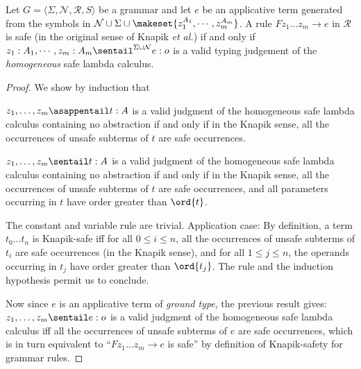 \begin{proposition}
\label{prop:safegram_safelmd}
 Let $G = \langle \Sigma, \mathcal{N}, \mathcal{R},
  S \rangle$ be a grammar and let $e$ be an applicative term generated
  from the symbols in $\mathcal{N} \cup \Sigma \cup \makeset{z_1^{A_1},
    \cdots, z_m^{A_m}}$.  A rule $F z_1 \ldots z_m \rightarrow e$ in
  $\mathcal{R}$ is safe (in the original sense of Knapik \emph{et al.}) if and only if $ z_1 : A_1, \cdots, z_m : A_m
  \sentail^{\Sigma \cup \mathcal{N}} e : o$ is a valid typing judgement
  of the \emph{homogeneous} safe lambda calculus.
\end{proposition}
\begin{proof}
We show by induction that \begin{asparaenum}
\item  $z_1,\ldots, z_m \asappentail t:A$ is a valid judgment of the homogeneous safe lambda calculus containing no abstraction if and only if in the Knapik sense, all the occurrences of unsafe subterms of $t$ are safe occurrences.
\item $z_1,\ldots, z_m \sentail t:A$ is a valid judgment of the homogeneous safe lambda calculus containing no abstraction if and only if in the Knapik sense, all the occurrences of unsafe subterms of $t$ are safe occurrences, and all parameters occurring in $t$ have order greater than $\ord{t}$. \end{asparaenum}
The constant and variable rule are trivial. Application case: By definition, a term $t_0 \ldots t_n$ is Knapik-safe iff for all $0\leq i \leq n$, all the occurrences of unsafe subterms of $t_i$ are safe occurrences (in the Knapik sense), and for all $1\leq j \leq n$, the operands occurring in $t_j$ have order greater than $\ord{t_j}$. The  rule and the induction hypothesis permit us to conclude.

Now since $e$ is an applicative term of \emph{ground type}, the previous result gives:
$z_1,\ldots, z_m \sentail e:o$ is a valid judgment of the homogeneous safe lambda calculus iff
all the occurrences of unsafe subterms of $e$ are safe occurrences, which is in turn equivalent to ``$F z_1 \ldots z_m \rightarrow e$ is safe'' by definition of Knapik-safety for grammar rules.
\end{proof}

